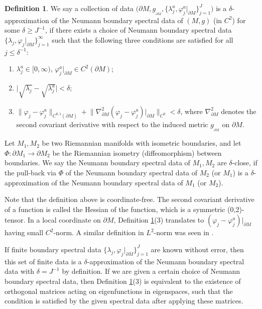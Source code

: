 \documentclass[11pt,letterpaper]{amsart}
\numberwithin{equation}{section}
\theoremstyle{definition}
\newtheorem{deferror}{Definition}[section]
\theoremstyle{plain}
\theoremstyle{definition}
\theoremstyle{plain}
\theoremstyle{definition}
\theoremstyle{plain}
\begin{document}
\begin{deferror}\label{deferror}
We say a collection of data $\big(\partial M,g_{_{\partial M}},\{\lambda_j^a,\varphi_j^a|_{\partial M}\}_{j=1}^{J}\big)$ is a $\delta$-approximation of the Neumann boundary spectral data of $(M,g)$ (in $C^2$) for some $\delta\geqslant J^{-1}$, if there exists a choice of Neumann boundary spectral data $\{\lambda_j,\varphi_j|_{\partial M}\}_{j=1}^{\infty}$ such that the following three conditions are satisfied for all $j\leqslant \delta^{-1}$:
\begin{enumerate}[(1)]
\item $\lambda_j^a\in [0,\infty)$, $\varphi_j^a |_{\partial M}\in C^2(\partial M)$; 
\item $\big|\sqrt{\lambda_j}-\sqrt{\lambda_j^a} \big|<\delta$;
\item $\big\|\varphi_j - \varphi_j^a \big\|_{C^{0,1}(\partial M)}+ \big\|\nabla_{\partial M}^2 (\varphi_j- \varphi_j^a)|_{\partial M} \big\|_{C^0}< \delta$, where $\nabla_{\partial M}^2$ denotes the second covariant derivative with respect to the induced metric $g_{_{\partial M}}$ on $\partial M$.
\end{enumerate}

Let $M_1,M_2$ be two Riemannian manifolds with isometric boundaries, and let $\Phi:\partial M_1\to \partial M_2$ be the Riemannian isometry (diffeomorphism) between boundaries. We say the Neumann boundary spectral data of $M_1,M_2$ are $\delta$-close, if the pull-back via $\Phi$ of the Neumann boundary spectral data of $M_2$ (or $M_1$) is a $\delta$-approximation of the Neumann boundary spectral data of $M_1$ (or $M_2$).
\end{deferror}

Note that the definition above is coordinate-free. The second covariant derivative of a function is called the Hessian of the function, which is a symmetric (0,2)-tensor. In a local coordinate on $\partial M$, Definition \ref{deferror}(3) translates to $(\varphi_j- \varphi_j^a)|_{\partial M}$ having small $C^2$-norm. A similar definition in $L^2$-norm was seen in \cite{BKL3}.

If finite boundary spectral data $\{\lambda_j,\varphi_j|_{\partial M}\}_{j=1}^{J}$ are known without error, then this set of finite data is a $\delta$-approximation of the Neumann boundary spectral data with $\delta=J^{-1}$ by definition. If we are given a certain choice of Neumann boundary spectral data, then Definition \ref{deferror}(3) is equivalent to the existence of orthogonal matrices acting on eigenfunctions in eigenspaces, such that the condition is satisfied by the given spectral data after applying these matrices.
\end{document}

